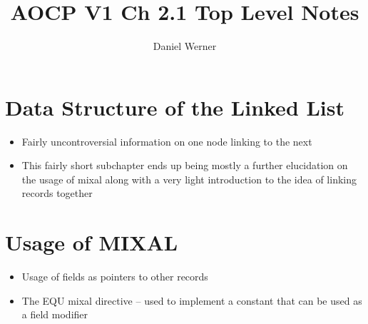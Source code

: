 \documentclass{article}
\title{AOCP V1 Ch 2.1 Top Level Notes}
\author{Daniel Werner}
\begin{document}
\maketitle

\section*{Data Structure of the Linked List}

\begin{itemize}
    \item Fairly uncontroversial information on one node linking to the next
    \item This fairly short subchapter ends up being mostly a further elucidation on the usage of mixal along with a very light introduction to the idea of linking records together
\end{itemize}

\section*{Usage of MIXAL}

\begin{itemize}
    \item Usage of fields as pointers to other records
    \item The EQU mixal directive -- used to implement a constant that can be used as a field modifier
\end{itemize}
\end{document}
